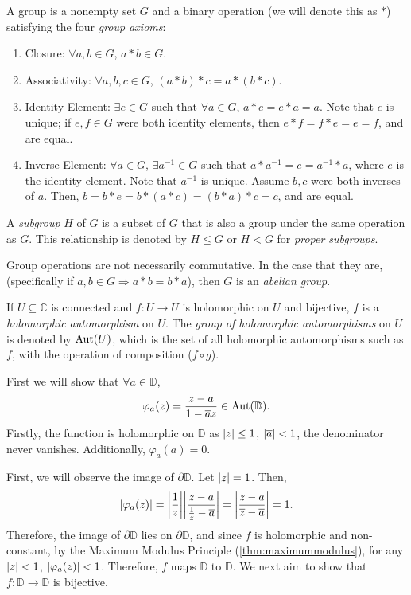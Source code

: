 \begin{definition}[Group]\label{def:group}
    A group is a nonempty set \(G\) and a binary operation (we will denote this as \(*\)) satisfying the four \textit{group axioms}:
    \begin{enumerate}
        \item Closure: \(\forall a,b\in G\), \(a*b\in G\).
        \item Associativity: \(\forall a,b,c\in G\), \((a*b)*c=a*(b*c)\).
        \item Identity Element: \(\exists e\in G\) such that \(\forall a\in G\), \(a*e=e*a=a\). Note that \(e\) is unique; if \(e,f\in G\) were both identity elements, then \(e*f=f*e=e=f\), and are equal.
        \item Inverse Element: \(\forall a\in G\), \(\exists a^{-1}\in G\) such that \(a*a^{-1}=e=a^{-1}*a\), where \(e\) is the identity element. Note that \(a^{-1}\) is unique. Assume \(b,c\) were both inverses of \(a\). Then, \(b=b*e=b*(a*c)=(b*a)*c=c\), and are equal.
    \end{enumerate}
    A \textit{subgroup} \(H\) of \(G\) is a subset of \(G\) that is also a group under the same operation as \(G\). This relationship is denoted by \(H\leq G\) or \(H<G\) for \textit{proper subgroups}.
\end{definition}

Group operations are not necessarily commutative. In the case that they are, (specifically if \(a,b\in G\Rightarrow a*b=b*a\)), then \(G\) is an \textit{abelian group}.

If \(U\subseteq\mathbb{C}\) is connected and \(f:U\to U\) is holomorphic on \(U\) and bijective, \(f\) is a \textit{holomorphic automorphism} on \(U\). The \textit{group of holomorphic automorphisms} on \(U\) is denoted by \(\operatorname{Aut}(U)\), which is the set of all holomorphic automorphisms such as \(f\), with the operation of composition (\(f\circ g\)).

First we will show that \(\forall a\in\mathbb{D}\),
\begin{equation}
    \varphi_a(z)=\frac{z-a}{1-\overline{a}z}\in\operatorname{Aut}(\mathbb{D}).\label{eq:mobiustransformationgroupofholomorphicautomorphismsunitdisk_statement}
\end{equation}
Firstly, the function is holomorphic on \(\mathbb{D}\) as \(\abs{z}\le1\), \(\abs{\overline{a}}<1\), the denominator never vanishes. Additionally, \(\varphi_a(a)=0\).

First, we will observe the image of \(\partial\mathbb{D}\). Let \(\abs{z}=1\). Then,
\[\abs{\varphi_a(z)}=\abs{\frac{1}{z}}\abs{\frac{z-a}{\frac{1}{z}-\overline{a}}}=\abs{\frac{z-a}{\overline{z}-\overline{a}}}=1.\]
Therefore, the image of \(\partial\mathbb{D}\) lies on \(\partial\mathbb{D}\), and since \(f\) is holomorphic and non-constant, by the Maximum Modulus Principle (\cref{thm:maximummodulus}), for any \(\abs{z}<1\), \(\abs{\varphi_a(z)}<1\). Therefore, \(f\) maps \(\mathbb{D}\) to \(\mathbb{D}\). We next aim to show that \(f:\mathbb{D}\to\mathbb{D}\) is bijective.

